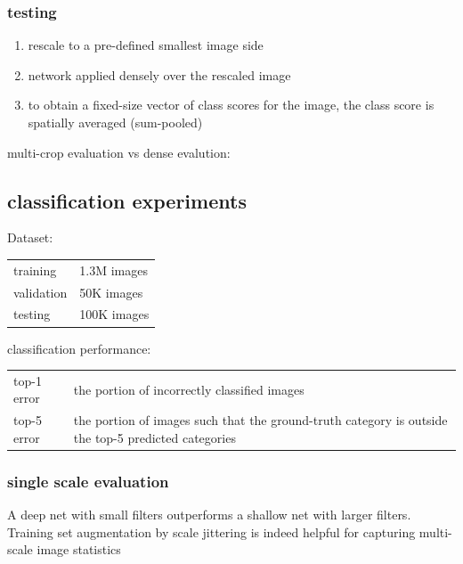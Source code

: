 \documentclass[11pt]{article}
\begin{document}
\subsubsection{testing}
\label{sec-2-4-2}
\begin{enumerate}
\item rescale to a pre-defined smallest image side \\
\item network applied densely over the rescaled image \\
\item to obtain a fixed-size vector of class scores for the image, the class score is spatially averaged (sum-pooled) \\
\end{enumerate}

multi-crop evaluation vs dense evalution: \\



\subsection{classification experiments}
\label{sec-2-5}
Dataset: \\
\begin{center}
\begin{tabular}{ll}
training & 1.3M images\\
validation & 50K images\\
testing & 100K images\\
\end{tabular}
\end{center}


classification performance: \\
\begin{center}
\begin{tabular}{ll}
top-1 error & the portion of incorrectly classified images\\
top-5 error & the portion of images such that the ground-truth category is outside the top-5 predicted categories\\
\end{tabular}
\end{center}


\subsubsection{single scale evaluation}
\label{sec-2-5-1}

A deep net with small filters outperforms a shallow net with larger filters. \\
Training set augmentation by scale jittering is indeed helpful for capturing multi-scale image statistics \\
\end{document}
